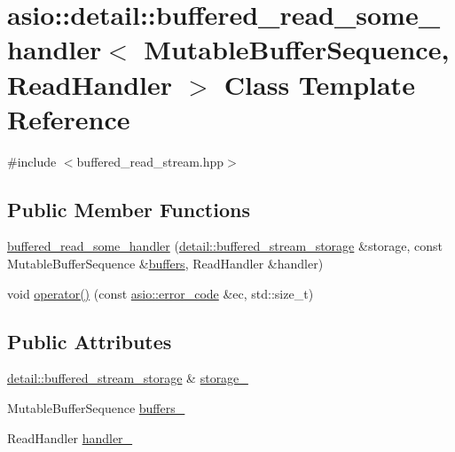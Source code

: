 \hypertarget{classasio_1_1detail_1_1buffered__read__some__handler}{}\section{asio\+:\+:detail\+:\+:buffered\+\_\+read\+\_\+some\+\_\+handler$<$ Mutable\+Buffer\+Sequence, Read\+Handler $>$ Class Template Reference}
\label{classasio_1_1detail_1_1buffered__read__some__handler}


{\ttfamily \#include $<$buffered\+\_\+read\+\_\+stream.\+hpp$>$}

\subsection*{Public Member Functions}
\begin{DoxyCompactItemize}
\item 
\hyperlink{classasio_1_1detail_1_1buffered__read__some__handler_a38463f5bfc2f7ecc4969a290c05cb7b3}{buffered\+\_\+read\+\_\+some\+\_\+handler} (\hyperlink{classasio_1_1detail_1_1buffered__stream__storage}{detail\+::buffered\+\_\+stream\+\_\+storage} \&storage, const Mutable\+Buffer\+Sequence \&\hyperlink{group__async__read_ga54dede45c3175148a77fe6635222c47d}{buffers}, Read\+Handler \&handler)
\item 
void \hyperlink{classasio_1_1detail_1_1buffered__read__some__handler_a38590d40af619637df4b45b9d34295e6}{operator()} (const \hyperlink{classasio_1_1error__code}{asio\+::error\+\_\+code} \&ec, std\+::size\+\_\+t)
\end{DoxyCompactItemize}
\subsection*{Public Attributes}
\begin{DoxyCompactItemize}
\item 
\hyperlink{classasio_1_1detail_1_1buffered__stream__storage}{detail\+::buffered\+\_\+stream\+\_\+storage} \& \hyperlink{classasio_1_1detail_1_1buffered__read__some__handler_ae516ae4c7472244010db6e7216e2793a}{storage\+\_\+}
\item 
Mutable\+Buffer\+Sequence \hyperlink{classasio_1_1detail_1_1buffered__read__some__handler_a694096e47a7851ebb94e59145d0247e9}{buffers\+\_\+}
\item 
Read\+Handler \hyperlink{classasio_1_1detail_1_1buffered__read__some__handler_aea902699b5dbf6b5ef4abb29a555cdf7}{handler\+\_\+}
\end{DoxyCompactItemize}


